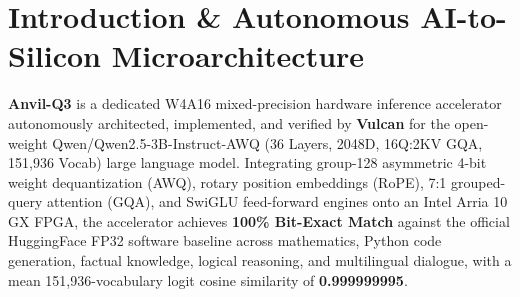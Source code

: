 \documentclass[11pt,a4paper]{article}
\begin{document}
\section{Introduction \& Autonomous AI-to-Silicon Microarchitecture}

\textbf{Anvil-Q3} is a dedicated W4A16 mixed-precision hardware inference accelerator autonomously architected, implemented, and verified by \textbf{Vulcan} for the open-weight Qwen/\allowbreak{}Qwen2.5-3B-Instruct-AWQ (\allowbreak{}36 Layers,\allowbreak{} 2048D,\allowbreak{} 16Q:2KV GQA,\allowbreak{} 151,\allowbreak{}936 Vocab)\allowbreak{} large language model. Integrating group-128 asymmetric 4-bit weight dequantization (AWQ), rotary position embeddings (RoPE), 7:1 grouped-query attention (GQA), and SwiGLU feed-forward engines onto an Intel Arria 10 GX FPGA, the accelerator achieves \textbf{100\% Bit-Exact Match} against the official HuggingFace FP32 software baseline across mathematics, Python code generation, factual knowledge, logical reasoning, and multilingual dialogue, with a mean 151,936-vocabulary logit cosine similarity of \textbf{0.999999995}.

\vspace{2pt}
\end{document}
